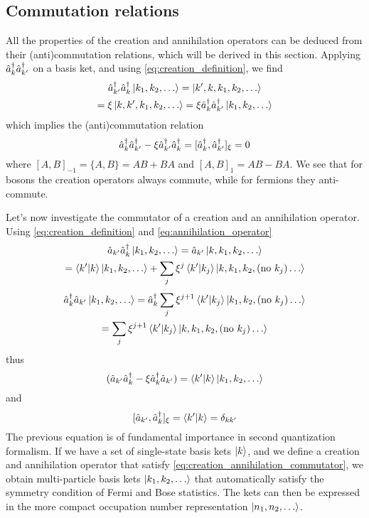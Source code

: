 \subsection{Commutation relations}
All the properties of the creation and annihilation operators can be deduced from their (anti)commutation relations, which will be derived in this section. Applying $\hat{a}^\dagger_k\hat{a}^\dagger_{k'}$ on a basis ket, and using  \cref{eq:creation_definition}, we find
\begin{multline}
    \hat{a}^\dagger_{k'}\hat{a}^\dagger_k \ket{k_1, k_2, \dots}
    = \ket{k',k,k_1, k_2, \dots}
    \\= \xi \ket{k,k',k_1, k_2, \dots}
    = \xi \hat{a}^\dagger_k\hat{a}^\dagger_{k'}\ket{k_1, k_2, \dots}
\end{multline}
which implies the (anti)commutation relation
\begin{equation}
    \hat{a}^\dagger_k\hat{a}^\dagger_{k'} - \xi \hat{a}^\dagger_{k'}\hat{a}^\dagger_k = [\hat{a}^\dagger_k, \hat{a}^\dagger_{k'}]_\xi = 0
\end{equation}
where $[A,B]_{-1} = \{A,B\} = AB+BA$ and $[A,B]_{1} = AB - BA$. We see that for bosons the creation operators always commute, while for fermions they anti-commute.

Let's now investigate the commutator of a creation and an annihilation operator. Using \cref{eq:creation_definition} and  \cref{eq:annihilation_operator}
\begin{multline}
    \hat{a}_{k'}\hat{a}^\dagger_k \ket{k_1, k_2, \dots}
    = \hat{a}_{k'} \ket{k,k_1, k_2, \dots}
    \\= \braket{k'}{k} \ket{k_1, k_2, \dots}
    +    \sum_{j} \xi^{j} \braket{k'}{k_j} \ket{k,k_1, k_2, (\text{no } k_j) \dots}
\end{multline}
\begin{multline}
    \hat{a}^\dagger_k\hat{a}_{k'} \ket{k_1, k_2, \dots}
    = \hat{a}^\dagger_k \sum_{j} \xi^{j+1} \braket{k'}{k_j} \ket{k_1, k_2, (\text{no } k_j) \dots}
    \\= \sum_{j} \xi^{j+1} \braket{k'}{k_j} \ket{k,k_1, k_2, (\text{no } k_j) \dots}
\end{multline}
thus
\begin{equation}
    (\hat{a}_{k'}\hat{a}^\dagger_k -\xi  \hat{a}^\dagger_k\hat{a}_{k'}) = \braket{k'}{k} \ket{k_1, k_2, \dots}
\end{equation}
and
\begin{equation} \label{eq:creation_annihilation_commutator}
    [\hat{a}_{k'}, \hat{a}^\dagger_k]_\xi = \braket{k'}{k} = \delta_{kk'}
\end{equation}
The previous equation is of fundamental importance in second quantization formalism. If we have a set of single-state basis kets $\ket{k}$, and we define a creation and annihilation operator that satisfy \cref{eq:creation_annihilation_commutator}, we obtain multi-particle basis kets $\ket{k_1, k_2, \dots}$ that automatically satisfy the symmetry condition of Fermi and Bose statistics. The kets can then be expressed in the more compact occupation number representation $\ket{n_{1}, n_{2}, \dots}$.

